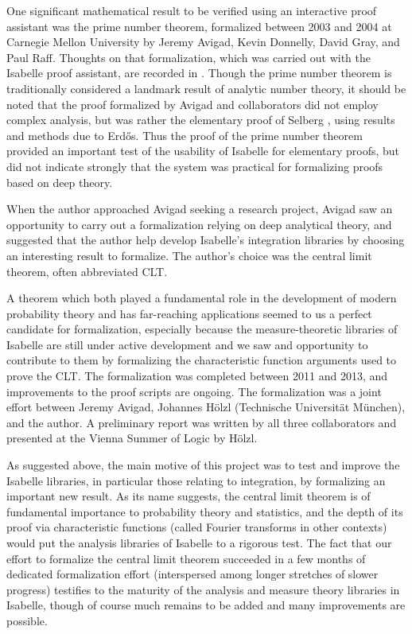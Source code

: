 \documentclass{article}
\theoremstyle{definition}
\begin{document}
One significant mathematical result to be verified using an interactive proof assistant was the prime number theorem, formalized between 2003 and 2004 at Carnegie Mellon University by Jeremy Avigad, Kevin Donnelly, David Gray, and Paul Raff. Thoughts on that formalization, which was carried out with the Isabelle proof assistant, are recorded in \cite{avigad-etal-pnt}. Though the prime number theorem is traditionally considered a landmark result of analytic number theory, it should be noted that the proof formalized by Avigad and collaborators did not employ complex analysis, but was rather the elementary proof of Selberg \cite{selberg-pnt}, using results and methods due to Erd{\H{o}}s. Thus the proof of the prime number theorem provided an important test of the usability of Isabelle for elementary proofs, but did not indicate strongly that the system was practical for formalizing proofs based on deep theory.

When the author approached Avigad seeking a research project, Avigad saw an opportunity to carry out a formalization relying on deep analytical theory, and suggested that the author help develop Isabelle's integration libraries by choosing an interesting result to formalize. The author's choice was the central limit theorem, often abbreviated CLT.

A theorem which both played a fundamental role in the development of modern probability theory and has far-reaching applications seemed to us a perfect candidate for formalization, especially because the measure-theoretic libraries of Isabelle are still under active development and we saw and opportunity to contribute to them by formalizing the characteristic function arguments used to prove the CLT. The formalization was completed between 2011 and 2013, and improvements to the proof scripts are ongoing. The formalization was a joint effort between Jeremy Avigad, Johannes H\"olzl (Technische Universit\"at M\"unchen), and the author. A preliminary report \cite{prelim} was written by all three collaborators and presented at the Vienna Summer of Logic by H\"olzl.

As suggested above, the main motive of this project was to test and improve the Isabelle libraries, in particular those relating to integration, by formalizing an important new result. As its name suggests, the central limit theorem is of fundamental importance to probability theory and statistics, and the depth of its proof via characteristic functions (called Fourier transforms in other contexts) would put the analysis libraries of Isabelle to a rigorous test. The fact that our effort to formalize the central limit theorem succeeded in a few months of dedicated formalization effort (interspersed among longer stretches of slower progress) testifies to the maturity of the analysis and measure theory libraries in Isabelle, though of course much remains to be added and many improvements are possible.
\end{document}
